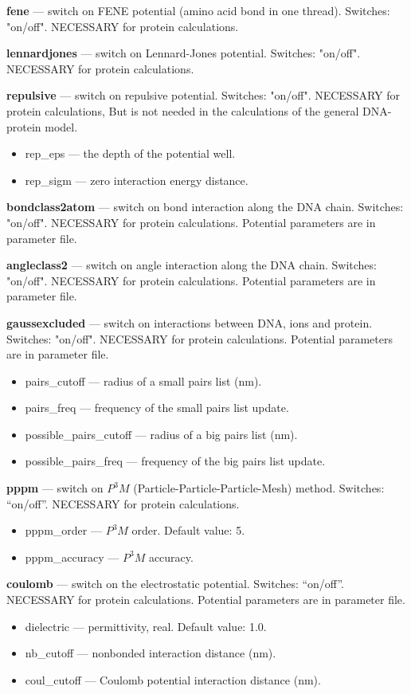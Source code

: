 \documentclass[12pt,a4paper]{article}
\begin{document}
{\bf fene} --- switch on FENE potential (amino acid bond in one thread). Switches: "on/off".  NECESSARY for protein calculations.

{\bf lennardjones} --- switch on Lennard-Jones potential. Switches: "on/off". NECESSARY for protein calculations.

{\bf repulsive} --- switch on repulsive potential. Switches: "on/off". NECESSARY for protein calculations, But is not needed in the calculations of the general DNA-protein model.
\begin{itemize}
\item rep\_eps --- the depth of the potential well.
\item rep\_sigm --- zero interaction energy distance.
\end{itemize}

{\bf bondclass2atom} --- switch on bond interaction along the DNA chain. Switches: "on/off". NECESSARY for protein calculations. Potential parameters are in parameter file.

{\bf angleclass2} --- switch on angle interaction along the DNA chain. Switches: "on/off". NECESSARY for protein calculations. Potential parameters are in parameter file.

{\bf gaussexcluded} --- switch on interactions between DNA, ions and protein. Switches: "on/off". NECESSARY for protein calculations. Potential parameters are in parameter file.
\begin{itemize}
\item pairs\_cutoff --- radius of a small pairs list (nm).
\item pairs\_freq --- frequency of the small pairs list update.
\item possible\_pairs\_cutoff --- radius of a big pairs list (nm).
\item possible\_pairs\_freq --- frequency of the big pairs list update.
\end{itemize}

{\bf pppm} --- switch on $P^3M$ (Particle-Particle-Particle-Mesh) method. Switches: ``on/off''. NECESSARY for protein calculations.
\begin{itemize}
\item pppm\_order --- $P^3M$ order. Default value: 5.
\item pppm\_accuracy --- $P^3M$ accuracy.
\end{itemize}

{\bf coulomb} --- switch on the electrostatic potential. Switches: ``on/off''. NECESSARY for protein calculations. Potential parameters are in parameter file.
\begin{itemize}
\item dielectric --- permittivity, real. Default value: 1.0.
\item nb\_cutoff --- nonbonded interaction distance (nm).
\item coul\_cutoff --- Coulomb potential interaction distance (nm).
\end{itemize}
\end{document}
